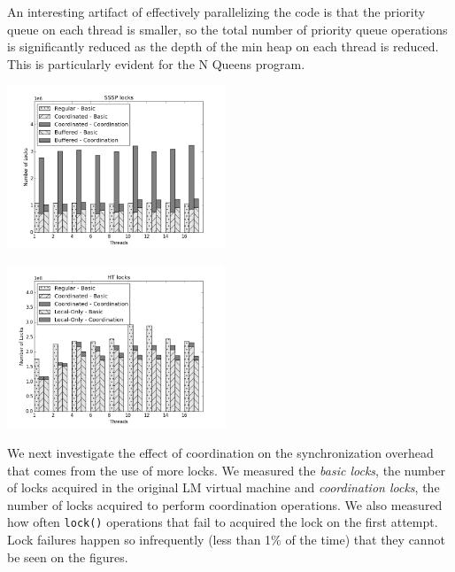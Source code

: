 An interesting artifact of effectively parallelizing the code is that
the priority queue on each thread is smaller, so the total number of
priority queue operations is significantly reduced as the depth of the
min heap on each thread is reduced.  This is particularly evident for
the N Queens program.

\begin{topfig}
   \begin{center}
      \includegraphics[width=6.5cm]{results/locks/sssp-locks.png}
   \end{center}
\end{topfig}

\begin{topfig}
   \begin{center}
      \includegraphics[width=6.5cm]{results/locks/ht-locks.png}
   \end{center}
\end{topfig}

We next investigate the effect of coordination on the synchronization
overhead that comes from the use of more locks.  We measured the
\emph{basic locks}, the number of locks acquired
in the original LM virtual machine and \emph{coordination locks}, the
number of locks acquired to perform coordination operations.  We also
measured how often \texttt{lock()} operations that fail to acquired
the lock on the first attempt.  Lock failures happen so infrequently
(less than 1\% of the time) that they cannot be seen on the figures.

